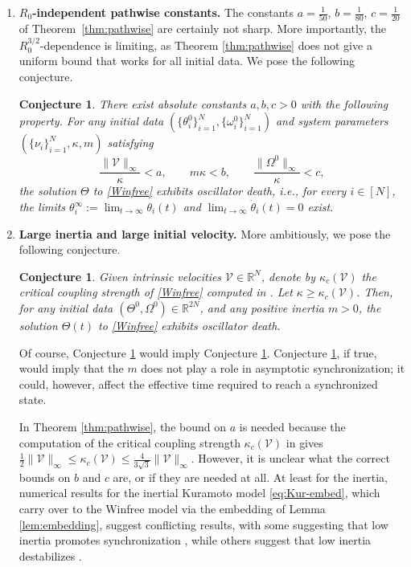 \documentclass[11pt,reqno]{amsart}
\newcommand{\R}{\mathbb{R}}
\newtheorem{conjecture}[lemma]{Conjecture}
\theoremstyle{definition}
\theoremstyle{remark}
\begin{document}
\begin{enumerate}
\item \textbf{$R_0$-independent pathwise constants.}
The constants
$a=\frac{1}{50}$, $b=\frac{1}{80}$, $c=\frac{1}{20}$ of Theorem~\ref{thm:pathwise} are certainly
not sharp. More importantly, the $R_0^{3/2}$-dependence is limiting, as Theorem \ref{thm:pathwise} does not give a uniform bound that works for all initial data. We pose the following conjecture.
\begin{conjecture}\label{conj:weak}
	There exist absolute constants $a,b,c>0$ with the following property. For any initial data
	$(\{\theta_i^0\}_{i=1}^N,\{\omega_i^0\}_{i=1}^N)$ and system parameters $(\{\nu_i\}_{i=1}^N,\kappa,m)$
	satisfying 
	\begin{equation}
		\frac{\|\mathcal{V}\|_\infty}{\kappa}<a,\qquad
		m\kappa<b,\qquad
		\frac{\|\Omega^0\|_\infty}{\kappa}<c,
	\end{equation}
	the solution $\Theta$ to \eqref{Winfree} exhibits oscillator death, i.e., for every $i\in[N]$, the limits
	$\theta_i^\infty:=\lim_{t\to\infty}\theta_i(t)$ and
	$\lim_{t\to\infty}\dot\theta_i(t)=0$ exist.
\end{conjecture}

\item \textbf{Large inertia and large initial velocity.}
More ambitiously, we pose the following conjecture.
\begin{conjecture}\label{conj:sharpest}
	Given intrinsic velocities $\mathcal{V}\in \mathbb{R}^N$, denote by $\kappa_c(\mathcal{V})$ the critical coupling strength of \eqref{Winfree} computed in \cite[Proposition 63]{ryoo2026oscillator}. Let $\kappa\ge \kappa_c(\mathcal{V})$. Then, for any initial data $(\Theta^0,\Omega^0)\in\R^{2N}$, and any positive inertia $m>0$, the solution $\Theta(t)$ to \eqref{Winfree} exhibits oscillator death.
\end{conjecture}
Of course, Conjecture \ref{conj:sharpest} would imply Conjecture \ref{conj:weak}. Conjecture \ref{conj:sharpest}, if true, would imply that the $m$ does not play a role in asymptotic synchronization; it could, however, affect the effective time required to reach a synchronized state.

In Theorem \ref{thm:pathwise}, the bound on $a$ is needed because the computation of the critical coupling strength $\kappa_c(\mathcal{V})$ in  \cite[Proposition 63]{ryoo2026oscillator} gives $\frac 12 \|\mathcal{V}\|_\infty\le \kappa_c(\mathcal{V})\le \frac{4}{3\sqrt{3}} \|\mathcal{V}\|_\infty$. However, it is unclear what the correct bounds on $b$ and $c$ are, or if they are needed at all. At least for the inertia, numerical results for the inertial Kuramoto model \eqref{eq:Kur-embed}, which carry over to the Winfree model via the embedding of Lemma \ref{lem:embedding}, suggest conflicting results, with some suggesting that low inertia promotes synchronization \cite{dorfler2012synchronization}, while others suggest that low inertia destabilizes  \cite{alberto2000required,chu2010boundary}.


\end{enumerate}
\end{document}
